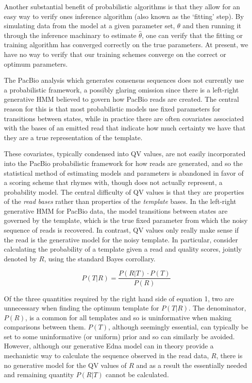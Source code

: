 \documentclass[fleqn,10pt]{SelfArx} %
\begin{document}
Another substantial benefit of probabilistic algorithms is that they allow for an easy way to verify ones inference algorithm (also known as the `fitting' step).  By simulating data from the model at a given parameter set, $\theta$ and then running it through the inference machinary to estimate $ \hat{ \theta} $, one can verify that the fitting or training algorithm has converged correctly on the true parameters.   At present, we have no way to verify that our training schemes converge on the correct or optimum parameters.

The PacBio analysis which generates consensus sequences does not currently use a probabilistic framework, a possibly glaring omission since there is a left-right generative HMM believed to govern how PacBio reads are created.  The central reason for this is that most probabilistic models use fixed parameters for transitions between states, while in practice there are often covariates associated with the bases of an emitted read that indicate how much certainty we have that they are a true representation of the template.

These covariates, typically condensed into QV values, are not easily incorporated into the PacBio probabilistic framework for how reads are generated, and so the statistical method of estimating models and parameters is abandoned in favor of a scoring scheme that rhymes with, though does not actually represent, a probability model.  The central difficulty of QV values is that they are properties of the \textit{read bases} rather than properties of the \textit{template} bases.  In the left-right generative HMM for PacBio data, the model transitions between states are governed by the template, which is the true fixed parameter from which the noisy sequence of reads is recovered.  In contrast, QV values only really make sense if the read is the generative model for the noisy template.  In particular, consider calculating the probability of a template given a read and quality scores, jointly denoted by $R$, using the standard Bayes corrollary.

\begin{dmath}
P(T|R) = \frac{P(R|T) \cdot P(T)}{P(R)}
\end{dmath}

Of the three quantities required by the right hand side of equation 1, two are unnecessary when finding the optimum template for $P(T|R)$.  The denominator, $P(R)$, is a common for all templates and so is uninformative when making comparisons between them. $P(T)$, although seemingly essential, can typically be set to some uninformative (or uniform) prior and so can similarly be avoided.  However, although our generative Edna model can in theory provide a mechanistic way to calculate the sequence observed in the read data, $R$, there is no generative model for the QV values of $R$ and as a result the essentially needed and remaining quantity $P(R|T)$ cannot be calculated.
\end{document}
